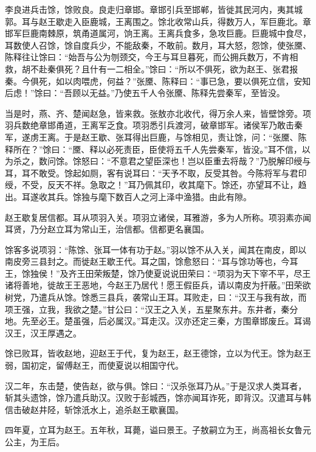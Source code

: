 \documentclass[12pt,UTF8]{ctexbook}
\begin{document}
李良进兵击馀，馀败良。良走归章邯。章邯引兵至邯郸，皆徙其民河内，夷其城郭。耳与赵王歇走入臣鹿城，王离围之。馀北收常山兵，得数万人，军巨鹿北。章邯军巨鹿南棘原，筑甬道属河，饷王离。王离兵食多，急攻巨鹿。巨鹿城中食尽，耳数使人召馀，馀自度兵少，不能敌秦，不敢前。数月，耳大怒，怨馀，使张黡、陈释往让馀曰：“始吾与公为刎颈交，今王与耳旦暮死，而公拥兵数万，不肯相救，胡不赴秦俱死？且什有一二相全。”馀曰：“所以不俱死，欲为赵王、张君报秦。今俱死，如以肉喂虎，何益？”张黡、陈释曰：“事已急，要以俱死立信，安知后虑！”馀曰：“吾顾以无益。”乃使五千人令张黡、陈释先尝秦军，至皆没。



当是时，燕、齐、楚闻赵急，皆来救。张敖亦北收代，得万余人来，皆壁馀旁。项羽兵数绝章邯甬道，王离军乏食。项羽悉引兵渡河，破章邯军。诸侯军乃敢击秦军，遂虏王离。于是赵王歇、张耳得出巨鹿，与馀相见，责让馀，问：“张黡、陈释所在？”馀曰：“黡、释以必死责臣，臣使将五千人先尝秦军，皆没。”耳不信，以为杀之，数问馀。馀怒曰：“不意君之望臣深也！岂以臣重去将哉？”乃脱解印绶与耳，耳不敢受。馀起如厕，客有说耳曰：“天予不取，反受其咎。今陈将军与君印绶，不受，反天不祥。急取之！”耳乃佩其印，收其麾下。馀还，亦望耳不让，趋出。耳遂收其兵。馀独与麾下数百人之河上泽中渔猎。由此有隙。



赵王歇复居信都。耳从项羽入关。项羽立诸侯，耳雅游，多为人所称。项羽素亦闻耳贤，乃分赵立耳为常山王，治信都。信都更名襄国。



馀客多说项羽：“陈馀、张耳一体有功于赵。”羽以馀不从入关，闻其在南皮，即以南皮旁三县封之。而徙赵王歇王代。耳之国，馀愈怒曰：“耳与馀功等也，今耳王，馀独侯！”及齐王田荣叛楚，馀乃使夏说说田荣曰：“项羽为天下宰不平，尽王诸将善地，徙故王王恶地，今赵王乃居代！愿王假臣兵，请以南皮为扞蔽。”田荣欲树党，乃遣兵从馀。馀悉三县兵，袭常山王耳。耳败走，曰：“汉王与我有故，而项王强，立我，我欲之楚。”甘公曰：“汉王之入关，五星聚东井。东井者，秦分地。先至必王。楚虽强，后必属汉。”耳走汉。汉亦还定三秦，方围章邯废丘。耳谒汉王，汉王厚遇之。



馀已败耳，皆收赵地，迎赵王于代，复为赵王，赵王德馀，立以为代王。馀为赵王弱，国初定，留傅赵王，而使夏说以相国守代。



汉二年，东击楚，使告赵，欲与俱。馀曰：“汉杀张耳乃从。”于是汉求人类耳者，斩其头遗馀，馀乃遣兵助汉。汉败于彭城西，馀亦闻耳诈死，即背汉。汉遣耳与韩信击破赵井陉，斩馀汦水上，追杀赵王歇襄国。



四年夏，立耳为赵王。五年秋，耳薨，谥曰景王。子敖嗣立为王，尚高祖长女鲁元公主，为王后。
\end{document}

